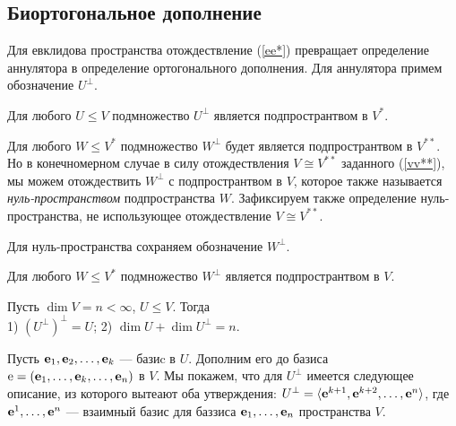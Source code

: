 \subsection{Биортогональное дополнение}



Для евклидова пространства отождествление (\ref{ee*}) превращает определение аннулятора в определение
ортогонального дополнения.
Для аннулятора примем обозначение $U^{\perp}$.

\begin{predl}\label{t8_56}
Для любого $U\leq V$ подмножество $U^{\perp}$ является подпространтвом в $V^*$.
\end{predl}
\dok
\edok

\otstup

Для любого $W\leq V^*$ подмножество $W^{\perp}$ будет является подпространтвом в $V^{**}$. 
Но в конечномерном случае в силу отождествления  $V\cong V^{**}$ заданного (\ref{vv**}), мы можем отождествить
$W^{\perp}$ с подпространтвом в $V$, которое также называется {\it нуль-пространством } подпространства $W$.
Зафиксируем также определение нуль-пространства, не использующее отождествление  $V\cong V^{**}$.

 
Для нуль-пространства сохраняем обозначение $W^{\perp}$.

\begin{predl}\label{t8_56}
Для любого $W\leq V^*$ подмножество $W^{\perp}$ является подпространтвом в $V$.
\end{predl}
\dok
\edok



\begin{theor}
Пусть  $\dim V=n< \infty$,  $U\leq V$. Тогда \\
1) $(U^{\bot})^{\bot} = U$;
2)  $\dim U + \dim U^{\bot} = n$.
\end{theor}
\dok Пусть $\mathbf{e}_1, \mathbf{e}_2, \ldots , \mathbf{e}_k$ --- базиc в $U$. Дополним его до 
базиса $\mathrm{e} = (\mathbf{e}_1,  \ldots , \mathbf{e}_k ,  \ldots , \mathbf{e}_n)$ в $V$.
Мы покажем, что для $U^{\perp}$ имеется следующее описание, из которого вытеают оба утверждения:
$U^{\perp} = \langle \mathbf{e}^{k+1}, \mathbf{e}^{k+2},  \ldots , \mathbf{e}^n \rangle$, где 
$\mathbf{e}^{1},  \ldots , \mathbf{e}^n$ --- взаимный базис для баззиса $\mathbf{e}_{1},  \ldots , \mathbf{e}_n$  пространства $V$.

